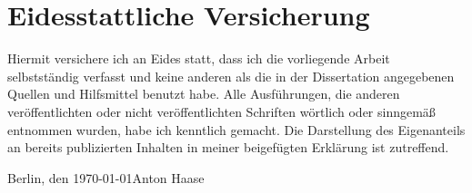 
\section*{Eidesstattliche Versicherung}
\vspace{3ex}

Hiermit versichere ich an Eides statt, dass ich die vorliegende Arbeit selbstständig verfasst und keine anderen als die in der Dissertation angegebenen Quellen und Hilfsmittel benutzt habe.
Alle Ausführungen, die anderen veröffentlichten oder nicht veröffentlichten Schriften wörtlich oder sinngemäß entnommen wurden, habe ich kenntlich gemacht.
Die Darstellung des Eigenanteils an bereits publizierten Inhalten in meiner beigefügten Erklärung ist zutreffend.
\vspace{3cm}

\noindent Berlin, den \today \hfill Anton Haase

\cleardoublepage
